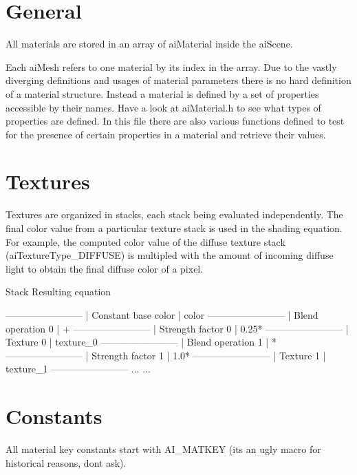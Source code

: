\hypertarget{materials_General}{}\section{General}\label{materials_General}
All materials are stored in an array of ai\+Material inside the ai\+Scene.

Each ai\+Mesh refers to one material by its index in the array. Due to the vastly diverging definitions and usages of material parameters there is no hard definition of a material structure. Instead a material is defined by a set of properties accessible by their names. Have a look at ai\+Material.\+h to see what types of properties are defined. In this file there are also various functions defined to test for the presence of certain properties in a material and retrieve their values.\hypertarget{materials_mat_tex}{}\section{Textures}\label{materials_mat_tex}
Textures are organized in stacks, each stack being evaluated independently. The final color value from a particular texture stack is used in the shading equation. For example, the computed color value of the diffuse texture stack (ai\+Texture\+Type\+\_\+\+D\+I\+F\+F\+U\+S\+E) is multipled with the amount of incoming diffuse light to obtain the final diffuse color of a pixel.


\begin{DoxyCode}
 Stack                               Resulting equation

------------------------
| Constant base color  |             color
------------------------ 
| Blend operation 0    |             +
------------------------
| Strength factor 0    |             0.25*
------------------------
| Texture 0            |             texture\_0
------------------------ 
| Blend operation 1    |             *
------------------------
| Strength factor 1    |             1.0*
------------------------
| Texture 1            |             texture\_1
------------------------
  ...                                ...
\end{DoxyCode}
\hypertarget{materials_keys}{}\section{Constants}\label{materials_keys}
All material key constants start with \textquotesingle{}A\+I\+\_\+\+M\+A\+T\+K\+E\+Y\textquotesingle{} (it\textquotesingle{}s an ugly macro for historical reasons, don\textquotesingle{}t ask).

